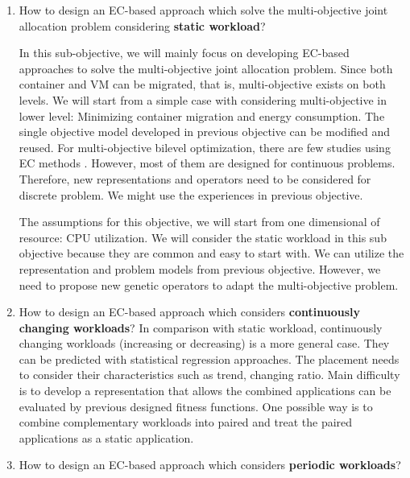\begin{enumerate}
	\item How to design an EC-based approach which solve the multi-objective joint allocation problem considering \textbf{static workload}?

	In this sub-objective, we will mainly focus on developing EC-based approaches to solve the multi-objective joint allocation problem. Since both container and VM can be migrated, that is, multi-objective exists on both levels. We will start from a simple case with considering multi-objective in lower level: Minimizing container migration and energy consumption. The single objective model developed in previous objective can be modified and reused. For multi-objective bilevel optimization,  there are few studies using EC methods \cite{Yin:2000bt, Deb:2010in}. However, most of them are designed for continuous problems. Therefore, new representations and operators need to be considered for discrete problem. We might use the experiences in previous objective.  

	The assumptions for this objective, we will start from one dimensional of resource: CPU utilization. We will consider the static workload in this sub objective because they are common and easy to start with.  We can utilize the representation and problem models from previous objective. However, we need to propose new genetic operators to adapt the multi-objective problem.

	\item How to design an EC-based approach which considers \textbf{continuously changing workloads}?
	In comparison with static workload, continuously changing workloads (increasing or decreasing) is a more general case. They can be predicted with statistical regression approaches. The placement needs to consider their characteristics such as trend, changing ratio. Main difficulty is to develop a representation that allows the combined applications can be evaluated by previous designed fitness functions. One possible way is to combine complementary workloads into paired and treat the paired applications as a static application.

	\item How to design an EC-based approach which considers \textbf{periodic workloads}?


\end{enumerate}
